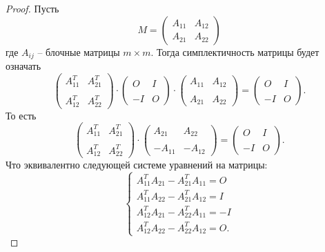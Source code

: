 \begin{proof}
    Пусть
    \[
        M = \begin{pmatrix*} A_{11} & A_{12} \\ A_{21} & A_{22}
        \end{pmatrix*}
    \]
    где $A_{ij}$ -- блочные матрицы $m \times m$.
    Тогда симплектичность матрицы будет означать
    \[
        \begin{pmatrix*}
            A^T_{11} & A_{21}^T \\ \\ A^T_{12} & A_{22}^T
        \end{pmatrix*} \cdot \begin{pmatrix*} O & I \\ \\ -I & O
        \end{pmatrix*} \cdot \begin{pmatrix*} A_{11} & A_{12} \\ \\ A_{21} & A_{22}
        \end{pmatrix*} = \begin{pmatrix*} O & I \\ \\ -I & O
        \end{pmatrix*}.
    \]
    То есть
    \[
        \begin{pmatrix*}
            A^T_{11} & A_{21}^T \\ \\ A^T_{12} & A_{22}^T
        \end{pmatrix*} \cdot
        \begin{pmatrix*}
            A_{21} & A_{22} \\ \\ -A_{11} & -A_{12}
        \end{pmatrix*} =
        \begin{pmatrix*}
            O & I \\ \\ -I & O
        \end{pmatrix*}.
    \]
    Что эквивалентно следующей системе уравнений на матрицы:
    \[
        \begin{cases}
            A_{11}^T A_{21} - A_{21}^T A_{11} = O \\
            A_{11}^T A_{22} - A^T_{21}A_{12} = I \\
            A^T_{12} A_{21} - A^T_{22} A_{11} = -I \\
            A^T_{12} A_{22} - A^T_{22} A_{12} = O.
        \end{cases}
    \]
\end{proof}
